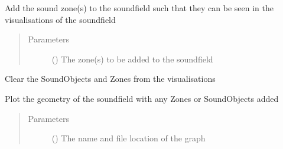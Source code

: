 \documentclass[letterpaper,10pt,english]{sphinxmanual}
\begin{document}
\begin{fulllineitems}
\begin{fulllineitems}
\label{\detokenize{source/pyzones:pyzones.Soundfield.add_zones}}
Add the sound zone(s) to the soundfield such that they can be seen in the visualisations of the soundfield
\begin{quote}\begin{description}
\item[{Parameters}] \leavevmode
{} (\sphinxstyleliteralemphasis{\sphinxupquote{{[}}}{\hyperref[\detokenize{source/pyzones:pyzones.Zone}]{\sphinxcrossref{\sphinxstyleliteralemphasis{\sphinxupquote{Zone}}}}}\sphinxstyleliteralemphasis{\sphinxupquote{{]}}}) \textendash{} The zone(s) to be added to the soundfield

\end{description}\end{quote}

\end{fulllineitems}


\begin{fulllineitems}
\label{\detokenize{source/pyzones:pyzones.Soundfield.clear_graphs}}
Clear the SoundObjects and Zones from the visualisations

\end{fulllineitems}


\begin{fulllineitems}
\label{\detokenize{source/pyzones:pyzones.Soundfield.plot_geometry}}
Plot the geometry of the soundfield with any Zones or SoundObjects added
\begin{quote}\begin{description}
\item[{Parameters}] \leavevmode
{} () \textendash{} The name and file location of the graph


\end{description}
\end{quote}
\end{fulllineitems}
\end{fulllineitems}
\end{document}
